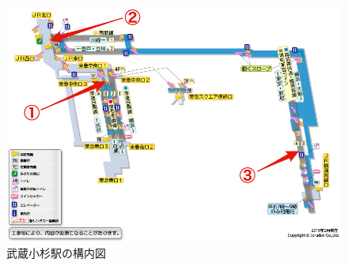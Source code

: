 \begin{figure}[H]
  \centering
  \includegraphics[width=120mm]{images/musako_2d.png}
  \caption{武蔵小杉駅の構内図} \label{fig:musako_2d}
\end{figure}
